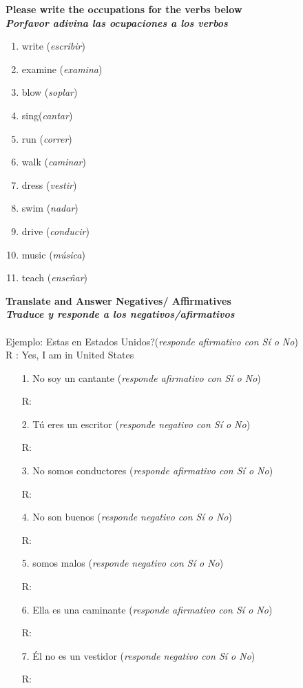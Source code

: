 \documentclass{article}
\begin{document}
\noindent \textbf{Please write the occupations for the verbs below}\\
\noindent \textbf{\textit{Porfavor adivina las ocupaciones a los verbos}}

\begin{enumerate}
\item write (\textit{escribir}) 
\item examine (\textit{examina}) 
\item blow (\textit{soplar}) 
\item sing(\textit{cantar}) 
\item run (\textit{correr}) 
\item walk (\textit{caminar}) 
\item dress (\textit{vestir}) 
\item swim (\textit{nadar}) 
\item drive (\textit{conducir}) 
\item music (\textit{m\'usica}) 
\item teach (\textit{ense\^nar}) 
\end{enumerate}

\noindent \textbf{Translate and Answer Negatives/ Affirmatives}\\
\noindent \textbf{\textit{Traduce y responde a los negativos/afirmativos}}\\\\
\noindent Ejemplo: Estas en Estados Unidos?(\textit{responde afirmativo con S\'i o No})\\
\noindent R \quad \quad \quad : Yes, I am in United States \\
\begin{itemize}
\item[1.] No soy un cantante (\textit{responde afirmativo con S\'i o No})
\item[R:]
\item[2.] T\'u eres un escritor (\textit{responde negativo con S\'i o No})
\item[R:] 
\item[3.] No somos conductores (\textit{responde afirmativo con S\'i o No})
\item[R:]
\item[4.] No son buenos (\textit{responde negativo con S\'i o No})
\item[R:]
\item[5.] somos malos (\textit{responde negativo con S\'i o No})
\item[R:]
\item[6.] Ella es una caminante (\textit{responde afirmativo con S\'i o No})
\item[R:]
\item[7.] \'El no es un vestidor (\textit{responde negativo con S\'i o No})
\item[R:]
\end{itemize}
\end{document}

